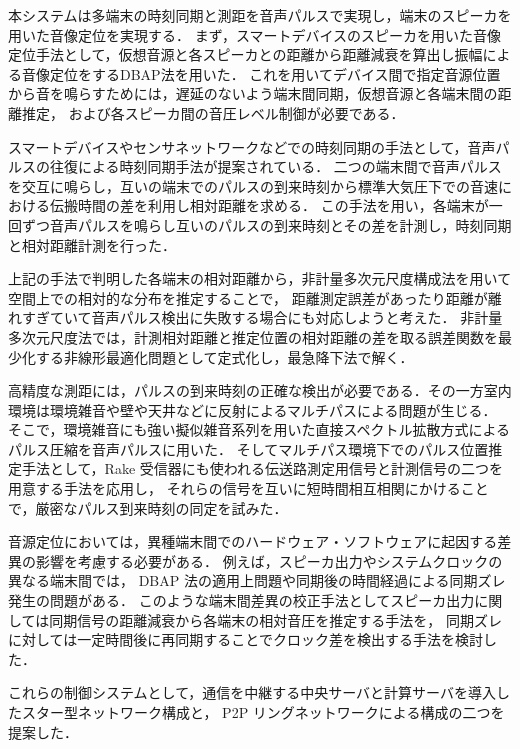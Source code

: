 本システムは多端末の時刻同期と測距を音声パルスで実現し，端末のスピーカを用いた音像定位を実現する．
まず，スマートデバイスのスピーカを用いた音像定位手法として，仮想音源と各スピーカとの距離から距離減衰を算出し振幅による音像定位をするDBAP法を用いた\cite{dbap}．
これを用いてデバイス間で指定音源位置から音を鳴らすためには，遅延のないよう端末間同期，仮想音源と各端末間の距離推定，
および各スピーカ間の音圧レベル制御が必要である．


スマートデバイスやセンサネットワークなどでの時刻同期の手法として，音声パルスの往復による時刻同期手法が提案されている\cite{tpsn}．
二つの端末間で音声パルスを交互に鳴らし，互いの端末でのパルスの到来時刻から標準大気圧下での音速における伝搬時間の差を利用し相対距離を求める．
この手法を用い，各端末が一回ずつ音声パルスを鳴らし互いのパルスの到来時刻とその差を計測し，時刻同期と相対距離計測を行った．


上記の手法で判明した各端末の相対距離から，非計量多次元尺度構成法を用いて空間上での相対的な分布を推定することで，
距離測定誤差があったり距離が離れすぎていて音声パルス検出に失敗する場合にも対応しようと考えた．
非計量多次元尺度法では，計測相対距離と推定位置の相対距離の差を取る誤差関数を最少化する非線形最適化問題として定式化し，最急降下法で解く．


高精度な測距には，パルスの到来時刻の正確な検出が必要である．その一方室内環境は環境雑音や壁や天井などに反射によるマルチパスによる問題が生じる．
そこで，環境雑音にも強い擬似雑音系列を用いた直接スペクトル拡散方式によるパルス圧縮を音声パルスに用いた．
そしてマルチパス環境下でのパルス位置推定手法として，Rake 受信器にも使われる伝送路測定用信号と計測信号の二つを用意する手法を応用し，
それらの信号を互いに短時間相互相関にかけることで，厳密なパルス到来時刻の同定を試みた．


音源定位においては，異種端末間でのハードウェア・ソフトウェアに起因する差異の影響を考慮する必要がある．
例えば，スピーカ出力やシステムクロックの異なる端末間では， DBAP 法の適用上問題や同期後の時間経過による同期ズレ発生の問題がある．
このような端末間差異の校正手法としてスピーカ出力に関しては同期信号の距離減衰から各端末の相対音圧を推定する手法を，
同期ズレに対しては一定時間後に再同期することでクロック差を検出する手法を検討した．


これらの制御システムとして，通信を中継する中央サーバと計算サーバを導入したスター型ネットワーク構成と， P2P リングネットワークによる構成の二つを提案した．
